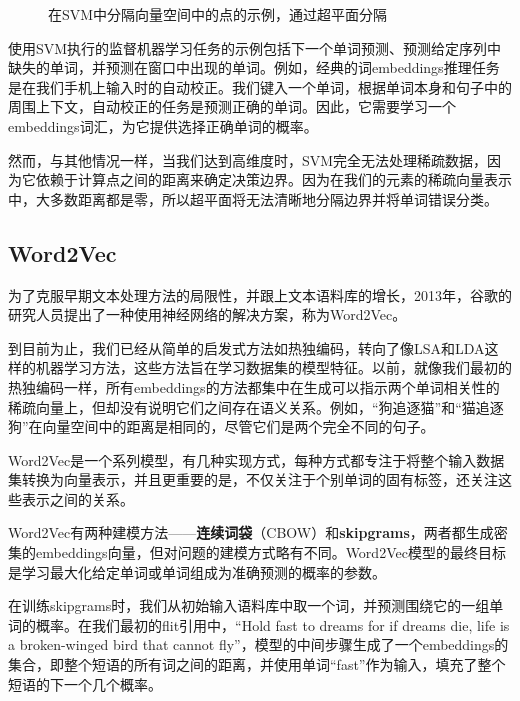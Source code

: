 \documentclass[Chinese, 11pt, table]{diazessay} %
\begin{document}
\begin{CJK}{UTF8}{gbsn}
\begin{sloppypar}
\begin{figure}[H]
\caption{在SVM中分隔向量空间中的点的示例，通过超平面分隔}
\end{figure}

使用SVM执行的监督机器学习任务的示例包括下一个单词预测、预测给定序列中缺失的单词，并预测在窗口中出现的单词。例如，经典的词embeddings推理任务是在我们手机上输入时的自动校正。我们键入一个单词，根据单词本身和句子中的周围上下文，自动校正的任务是预测正确的单词。因此，它需要学习一个embeddings词汇，为它提供选择正确单词的概率。

然而，与其他情况一样，当我们达到高维度时，SVM完全无法处理稀疏数据，因为它依赖于计算点之间的距离来确定决策边界。因为在我们的元素的稀疏向量表示中，大多数距离都是零，所以超平面将无法清晰地分隔边界并将单词错误分类。


\subsection{Word2Vec}

为了克服早期文本处理方法的局限性，并跟上文本语料库的增长，2013年，谷歌的研究人员提出了一种使用神经网络的解决方案，称为Word2Vec\citep{mikolov2013efficient}。

到目前为止，我们已经从简单的启发式方法如热独编码，转向了像LSA和LDA这样的机器学习方法，这些方法旨在学习数据集的模型特征。以前，就像我们最初的热独编码一样，所有embeddings的方法都集中在生成可以指示两个单词相关性的稀疏向量上，但却没有说明它们之间存在语义关系。例如，“狗追逐猫”和“猫追逐狗”在向量空间中的距离是相同的，尽管它们是两个完全不同的句子。

Word2Vec是一个系列模型，有几种实现方式，每种方式都专注于将整个输入数据集转换为向量表示，并且更重要的是，不仅关注于个别单词的固有标签，还关注这些表示之间的关系。

Word2Vec有两种建模方法——\textbf{连续词袋}（CBOW）和\textbf{skipgrams}，两者都生成密集的embeddings向量，但对问题的建模方式略有不同。Word2Vec模型的最终目标是学习最大化给定单词或单词组成为准确预测的概率的参数\citep{goldberg2014word2vec}。

在训练skipgrams时，我们从初始输入语料库中取一个词，并预测围绕它的一组单词的概率。在我们最初的flit引用中，“Hold fast to dreams for if dreams die, life is a broken-winged bird that cannot fly”，模型的中间步骤生成了一个embeddings的集合，即整个短语的所有词之间的距离，并使用单词“fast”作为输入，填充了整个短语的下一个几个概率。


\end{sloppypar}
\end{CJK}
\end{document}
